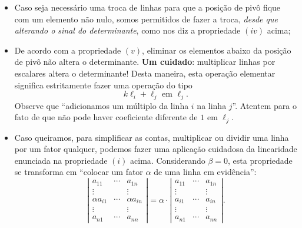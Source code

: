 \begin{itemize}
\item Caso seja necessário uma troca de linhas para que a posição de pivô fique com um elemento não nulo, somos permitidos de fazer a troca, \textit{desde que alterando o sinal do determinante}, como nos diz a propriedade $(iv)$ acima;
\item De acordo com a propriedade $(v)$, eliminar os elementos abaixo da posição de pivô não altera o determinante. \textbf{Um cuidado}: multiplicar linhas por escalares altera o determinante! Desta maneira, esta operação elementar significa estritamente fazer uma operação do tipo
\begin{equation}
k \ell_i + \ell_j \text{ em } \ell_j.
\end{equation} Observe que ``adicionamos um múltiplo da linha $i$ na linha $j$''. Atentem para o fato de que não pode haver coeficiente diferente de $1$ em $\ell_j$.
\item Caso queiramos, para simplificar as contas, multiplicar ou dividir uma linha por um fator qualquer, podemos fazer uma aplicação cuidadosa da linearidade enunciada na propriedade $(i)$ acima. Considerando $\beta = 0$, esta propriedade se transforma em ``colocar um fator $\alpha$ de uma linha em evidência'':
\begin{equation}
\left| \begin{matrix}
a_{11} & \cdots & a_{1n} \\
\vdots &  & \vdots \\
\alpha a_{i1} & \cdots & \alpha a_{in} \\
\vdots &  & \vdots \\
a_{n1} & \cdots & a_{nn}
\end{matrix} \right|  =
\alpha \cdot \left| \begin{matrix}
a_{11} & \cdots & a_{1n} \\
\vdots &  & \vdots \\
a_{i1} & \cdots & a_{in} \\
\vdots &  & \vdots \\
a_{n1} & \cdots & a_{nn}
\end{matrix}\right| .
\end{equation}
\end{itemize}

